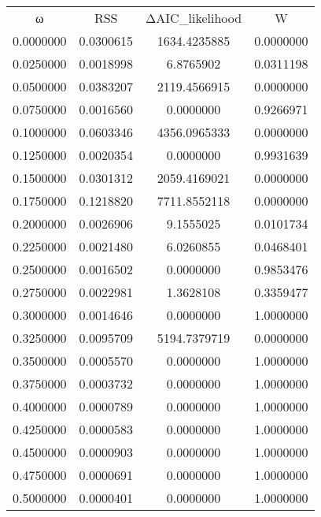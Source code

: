 \begin{tabular}{cccc}
ω & RSS & ΔAIC_likelihood & W\\
0.0000000 & 0.0300615 & 1634.4235885 & 0.0000000\\
0.0250000 & 0.0018998 & 6.8765902 & 0.0311198\\
0.0500000 & 0.0383207 & 2119.4566915 & 0.0000000\\
0.0750000 & 0.0016560 & 0.0000000 & 0.9266971\\
0.1000000 & 0.0603346 & 4356.0965333 & 0.0000000\\
0.1250000 & 0.0020354 & 0.0000000 & 0.9931639\\
0.1500000 & 0.0301312 & 2059.4169021 & 0.0000000\\
0.1750000 & 0.1218820 & 7711.8552118 & 0.0000000\\
0.2000000 & 0.0026906 & 9.1555025 & 0.0101734\\
0.2250000 & 0.0021480 & 6.0260855 & 0.0468401\\
0.2500000 & 0.0016502 & 0.0000000 & 0.9853476\\
0.2750000 & 0.0022981 & 1.3628108 & 0.3359477\\
0.3000000 & 0.0014646 & 0.0000000 & 1.0000000\\
0.3250000 & 0.0095709 & 5194.7379719 & 0.0000000\\
0.3500000 & 0.0005570 & 0.0000000 & 1.0000000\\
0.3750000 & 0.0003732 & 0.0000000 & 1.0000000\\
0.4000000 & 0.0000789 & 0.0000000 & 1.0000000\\
0.4250000 & 0.0000583 & 0.0000000 & 1.0000000\\
0.4500000 & 0.0000903 & 0.0000000 & 1.0000000\\
0.4750000 & 0.0000691 & 0.0000000 & 1.0000000\\
0.5000000 & 0.0000401 & 0.0000000 & 1.0000000\\
\end{tabular}
